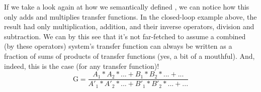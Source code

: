 If we take a look again at how we semantically defined %
\cmd{:<>}, we can notice how this only adds and multiplies transfer functions. In the closed-loop example above, the result had only multiplication, addition, and their inverse operators, division and subtraction. We can by this see that it's not far-fetched to assume a combined (by these operators) system's transfer function can always be written as a fraction of sums of products of transfer functions (yes, a bit of a mouthful). And, indeed, this is the case (for any transfer function)!
\begin{equation*}
    \text{G} = \frac{A_1*A_2*...+B_1*B_2*...+...}{A'_1*A'_2*...+B'_1*B'_2*...+...}
\end{equation*}




\LNReset